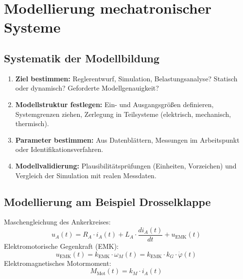 \section{Modellierung mechatronischer Systeme}

\subsection{Systematik der Modellbildung}
\begin{tcolorbox}
\begin{enumerate}
  \item \textbf{Ziel bestimmen:} Reglerentwurf, Simulation, Belastungsanalyse? Statisch oder dynamisch? Geforderte Modellgenauigkeit?
  \item \textbf{Modellstruktur festlegen:} Ein- und Ausgangsgrößen definieren, Systemgrenzen ziehen, Zerlegung in Teilsysteme (elektrisch, mechanisch, thermisch).
  \item \textbf{Parameter bestimmen:} Aus Datenblättern, Messungen im Arbeitspunkt oder Identifikationsverfahren.
  \item \textbf{Modellvalidierung:} Plausibilitätsprüfungen (Einheiten, Vorzeichen) und Vergleich der Simulation mit realen Messdaten.
\end{enumerate}
\end{tcolorbox}

\subsection{Modellierung am Beispiel Drosselklappe}

\begin{tcolorbox}
Maschengleichung des Ankerkreises:
\[
u_A(t) = R_A \cdot i_A(t) + L_A \cdot \frac{di_A(t)}{dt} + u_{\text{EMK}}(t)
\]
Elektromotorische Gegenkraft (EMK):
\[
u_{\text{EMK}}(t) = k_{\text{EMK}} \cdot \omega_M(t) = k_{\text{EMK}} \cdot k_G \cdot \dot{\varphi}(t)
\]
Elektromagnetisches Motormoment:
\[
M_{\text{Mot}}(t) = k_M \cdot i_A(t)
\]
\end{tcolorbox}

